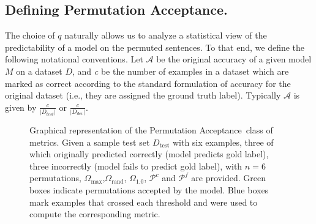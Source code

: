 \documentclass[letterpaper, 12pt]{report}
\newcommand{\PermAcc}{Permutation Acceptance} %
\begin{document}
\subsection{Defining \PermAcc.}

The choice of $q$ naturally allows us to analyze a statistical view of the predictability of a model on the permuted sentences. To that end, we define the following notational conventions. Let $\mathcal{A}$ be the original accuracy of a given model $M$ on a dataset $D$, and \textit{c} be the number of examples in a dataset which are marked as correct according to the standard formulation of accuracy for the original dataset (i.e., they are assigned the ground truth label). Typically $\mathcal{A}$ is given by $\frac{c}{|D_{test}|}$ or $\frac{c}{|D_{dev}|}$. %

\begin{figure}[t]
    \centering
    \caption{Graphical representation of the \PermAcc\ class of metrics. Given a sample test set ${D}_{\text{test}}$ with six examples, three of which originally predicted correctly (model predicts gold label), three incorrectly (model fails to predict gold label), with $n=6$ permutations, $\Omega_{\text{max}}$,$\Omega_{\text{rand}}$, $\Omega_{\text{1.0}}$, $\mathcal{P}^c$ and $\mathcal{P}^f$ are provided. Green boxes indicate permutations accepted by the model. Blue boxes mark examples that crossed each threshold and were used to compute the corresponding metric. }
    \label{fig:def_metrics}
\end{figure}
\end{document}
